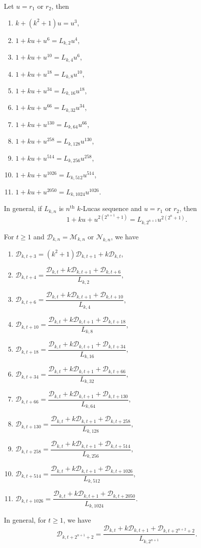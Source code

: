 \begin{lemma}
Let $u=r_{1}$ or $r_{2}$, then\label{3.4}
\begin{enumerate}
\item $k+(k^2+1)u=u^3$,
\item $1+ku+u^6=L_{k,2}u^4$,
\item $1+ku+u^{10}=L_{k,4}u^6$,
\item $1+ku+u^{18}=L_{k,8}u^{10}$,
\item $1+ku+u^{34}=L_{k,16}u^{18}$,
\item $1+ku+u^{66}=L_{k,32}u^{34}$,
\item $1+ku+u^{130}=L_{k,64}u^{66}$,
\item $1+ku+u^{258}=L_{k,128}u^{130}$,
\item $1+ku+u^{514}=L_{k,256}u^{258}$,
\item $1+ku+u^{1026}=L_{k,512}u^{514}$,
\item $1+ku+u^{2050}=L_{k,1024}u^{1026}$.
\end{enumerate}
In general, if $L_{k,n}$ is $n^{\text{th}}$ $k$-Lucas sequence and $u=r_{1}$ or $r_{2}$, then
$$1+ku+u^{2(2^{n+1}+1)}=L_{k,2^{n+1}}u^{2(2^{n}+1)}.$$
\end{lemma}
\begin{theorem}For $t\geq 1$ and $\mathcal{D}_{k,n}=\mathcal{M}_{k,n}$ or $\mathcal{N}_{k,n}$, we have\label{3.5}
\begin{enumerate}
\item $\mathcal{D}_{k,t+3}=(k^2+1)\mathcal{D}_{k,t+1}+k\mathcal{D}_{k,t}$,
\item $\mathcal{D}_{k,t+4}=\dfrac{\mathcal{D}_{k,t}+k\mathcal{D}_{k,t+1}+\mathcal{D}_{k,t+6}}{L_{k,2}}$,
\item $\mathcal{D}_{k,t+6}=\dfrac{\mathcal{D}_{k,t}+k\mathcal{D}_{k,t+1}+\mathcal{D}_{k,t+10}}{L_{k,4}}$,
\item $\mathcal{D}_{k,t+10}=\dfrac{\mathcal{D}_{k,t}+k\mathcal{D}_{k,t+1}+\mathcal{D}_{k,t+18}}{L_{k,8}}$,
\item $\mathcal{D}_{k,t+18}=\dfrac{\mathcal{D}_{k,t}+k\mathcal{D}_{k,t+1}+\mathcal{D}_{k,t+34}}{L_{k,16}}$,
\item $\mathcal{D}_{k,t+34}=\dfrac{\mathcal{D}_{k,t}+k\mathcal{D}_{k,t+1}+\mathcal{D}_{k,t+66}}{L_{k,32}}$,
\item $\mathcal{D}_{k,t+66}=\dfrac{\mathcal{D}_{k,t}+k\mathcal{D}_{k,t+1}+\mathcal{D}_{k,t+130}}{L_{k,64}}$,
\item $\mathcal{D}_{k,t+130}=\dfrac{\mathcal{D}_{k,t}+k\mathcal{D}_{k,t+1}+\mathcal{D}_{k,t+258}}{L_{k,128}}$,
\item $\mathcal{D}_{k,t+258}=\dfrac{\mathcal{D}_{k,t}+k\mathcal{D}_{k,t+1}+\mathcal{D}_{k,t+514}}{L_{k,256}}$,
\item $\mathcal{D}_{k,t+514}=\dfrac{\mathcal{D}_{k,t}+k\mathcal{D}_{k,t+1}+\mathcal{D}_{k,t+1026}}{L_{k,512}}$,
\item $\mathcal{D}_{k,t+1026}=\dfrac{\mathcal{D}_{k,t}+k\mathcal{D}_{k,t+1}+\mathcal{D}_{k,t+2050}}{L_{k,1024}}$.
\end{enumerate}
In general, for $ t\geq 1$, we have
$$\mathcal{D}_{k,t+2^{n+1}+2}=\dfrac{\mathcal{D}_{k,t}+k\mathcal{D}_{k,t+1}+\mathcal{D}_{k,t+2^{n+2}+2}}{L_{k,2^{n+1}}}.$$
\end{theorem}
